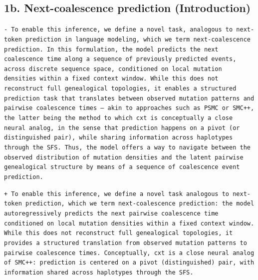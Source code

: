 \documentclass[10pt]{article}
\newcommand{\rem}[1]{\par\noindent\colorbox{rembg}{\parbox{\dimexpr\linewidth-2\fboxsep}{\small\textcolor{remtext}{\texttt{-\ #1}}}}}
\newcommand{\add}[1]{\par\noindent\colorbox{addbg}{\parbox{\dimexpr\linewidth-2\fboxsep}{\small\textcolor{addtext}{\texttt{+\ #1}}}}}
\begin{document}
\subsection*{\small 1b. Next-coalescence prediction (Introduction)}
\begin{mdframed}[style=diffbox]
\rem{To enable this inference, we define a novel task, analogous to next-token prediction in language modeling, which we term next-coalescence prediction. In this formulation, the model predicts the next coalescence time along a sequence of previously predicted events, across discrete sequence space, conditioned on local mutation densities within a fixed context window. While this does not reconstruct full genealogical topologies, it enables a structured prediction task that translates between observed mutation patterns and pairwise coalescence times --- akin to approaches such as PSMC or SMC++, the latter being the method to which cxt is conceptually a close neural analog, in the sense that prediction happens on a pivot (or distinguished pair), while sharing information across haplotypes through the SFS. Thus, the model offers a way to navigate between the observed distribution of mutation densities and the latent pairwise genealogical structure by means of a sequence of coalescence event prediction.}
\add{To enable this inference, we define a novel task analogous to next-token prediction, which we term next-coalescence prediction: the model autoregressively predicts the next pairwise coalescence time conditioned on local mutation densities within a fixed context window. While this does not reconstruct full genealogical topologies, it provides a structured translation from observed mutation patterns to pairwise coalescence times. Conceptually, cxt is a close neural analog of SMC++: prediction is centered on a pivot (distinguished) pair, with information shared across haplotypes through the SFS.}
\end{mdframed}
\end{document}
